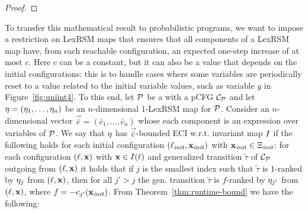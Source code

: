 \begin{proof}
%
\end{proof}

To transfer this mathematical result to probabilistic programs, we want to 
impose a restriction on LexRSM maps that ensures that all components of a 
LexRSM map have, from each reachable configuration, an expected one-step 
increase of at most $c$. Here $c$ can be a constant, but it can also be a value 
that depends on the initial configurations: this is to handle cases where some 
variables are periodically reset to a value related to the initial variable 
values, such as variable $y$ in Figure~\ref{fig:uniint4}. To this end, let 
$\mathcal{P}$ be a \PP{} with a pCFG $\mathcal{C}_{\mathcal{P}}$ and let 
$\mathbf{\eta}=(\eta_1,\dots,\eta_n)$ be an 
$n$-dimensional $1$-LexRSM map for $\mathcal{P}$. Consider an $n$-dimensional 
vector 
$\vec{\bar{c}}=(\bar{c}_1,\dots,\bar{c}_n)$ whose each component is an 
expression over variables of 
$\mathcal{P}$. We say 
that $\mathbf{\eta}$ has 
$\vec{\bar{c}}$-bounded ECI w.r.t. invariant map $I$ if the following holds 
for each initial configuration $(\ell_{\mathit{init}},\mathbf{x}_{\mathit{init}})$ with $\mathbf{x}_{\mathit{init}}\in 
\Xi_{\mathit{init}}$: for 
each 
configuration $(\ell,\mathbf{x})$ with $\mathbf{x}\in I(\ell)$ and generalized 
transition $\tilde{\tau}$ 
of 
$\mathcal{C}_{\mathcal{P}}$ outgoing from $(\ell,\mathbf{x})$ it holds that if $j$ is 
the smallest index such that 
$\tilde{\tau}$ is $1$-ranked by $\eta_j$ from $(\ell,\mathbf{x})$, then for all 
$j'>j$ the gen. transition $\tilde{\tau}$ is $f$-ranked by $\eta_{j'}$ from 
$(\ell,\mathbf{x})$, where $f=-c_{j'}(\mathbf{x}_{\mathit{init}})$. From 
Theorem~\ref{thm:runtime-bound} we have the following:


